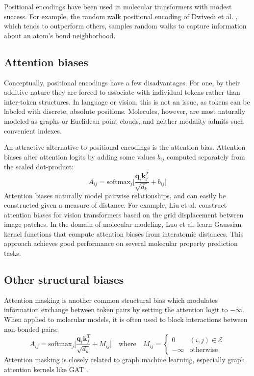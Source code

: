 \documentclass{article}
\begin{document}
Positional encodings have been used in molecular transformers \cite{graphormer} with modest success. For example, the random walk positional encoding of Dwivedi et al. \cite{rwpe}, which tends to outperform others, samples random walks to capture information about an atom's bond neighborhood. 

\subsection{Attention biases}

Conceptually, positional encodings have a few disadvantages. For one, by their additive nature they are forced to associate with individual tokens rather than inter-token structures. In language or vision, this is not an issue, as tokens can be labeled with discrete, absolute positions. Molecules, however, are most naturally modeled as graphs or Euclidean point clouds, and neither modality admits such convenient indexes. 

An attractive alternative to positional encodings is the attention bias. Attention biases alter attention logits by adding some values $b_{ij}$ computed separately from the scaled dot-product:
\begin{equation}\label{biased-attention}
    A_{ij} = \text{softmax}_j \Biggr[ \frac{\mathbf{q}_{i} \mathbf{k}_j^T}{\sqrt{d_k}} + b_{ij} \Biggr]
\end{equation}
Attention biases naturally model pairwise relationships, and can easily be constructed given a measure of distance. For example, Liu et al. \cite{swin} construct attention biases for vision transformers based on the grid displacement between image patches. In the domain of molecular modeling, Luo et al. \cite{gaussian-kernel} learn Gaussian kernel functions that compute attention biases from interatomic distances. This approach achieves good performance on several molecular property prediction tasks. 

\subsection{Other structural biases}

Attention masking is another common structural bias which modulates information exchange between token pairs by setting the attention logit to $-\infty$. When applied to molecular models, it is often used to block interactions between non-bonded pairs: 
\begin{equation}\label{masked-attention}
    A_{ij} = \text{softmax}_j \Biggr[ \frac{\mathbf{q}_{i} \mathbf{k}_j^T}{\sqrt{d_k}} + M_{ij} \Biggr] \quad \text{where} \quad M_{ij} = 
    \begin{cases}
        0 & (i, j) \in \mathcal{E} \\
        -\infty & \text{otherwise}
    \end{cases}
\end{equation}
Attention masking is closely related to graph machine learning, especially graph attention kernels like GAT \cite{gat}. 
\end{document}
